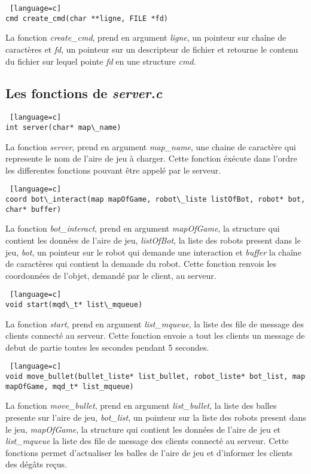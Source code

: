 \documentclass[a4paper, 11pt]{article}
\begin{document}
\begin {lstlisting} [language=c]
cmd create_cmd(char **ligne, FILE *fd)
\end{lstlisting}
La fonction \emph{create\_cmd}, prend en argument \emph{ligne}, un pointeur sur chaîne de caractères et \emph{fd}, un pointeur sur un descripteur de fichier et retourne le contenu du fichier sur lequel pointe \emph{fd} en une structure \emph{cmd}.\\

\newpage
\subsection{Les fonctions de \emph{server.c}}
\begin {lstlisting} [language=c]
int server(char* map\_name)
\end{lstlisting}
La fonction \emph{server}, prend en argument \emph{map\_name}, une chaine de caractère qui represente le nom de l'aire de jeu à charger. Cette
fonction éxécute dans l'ordre les differentes fonctions pouvant être appelé par le serveur.\\

\begin {lstlisting} [language=c]
coord bot\_interact(map mapOfGame, robot\_liste listOfBot, robot* bot, char* buffer)
\end{lstlisting}
La fonction \emph{bot\_interact}, prend en argument \emph{mapOfGame}, la structure qui contient les données de l'aire de jeu, \emph{listOfBot}, la liste des robots present dans le jeu, \emph{bot}, un pointeur sur le robot qui demande une interaction et \emph{buffer} la chaîne de caractères qui contient la demande du robot. Cette fonction renvois les coordonnées de l'objet, demandé par le client, au serveur.\\

\begin {lstlisting} [language=c]
void start(mqd\_t* list\_mqueue)
\end{lstlisting}
La fonction \emph{start}, prend en argument \emph{list\_mqueue}, la liste des file de message des clients connecté au serveur. Cette fonction envoie a tout les clients un message de debut de partie toutes les secondes pendant 5 secondes.\\

\begin {lstlisting} [language=c]
void move_bullet(bullet_liste* list_bullet, robot_liste* bot_list, map mapOfGame, mqd_t* list_mqueue)
\end{lstlisting}
La fonction \emph{move\_bullet}, prend en argument \emph{list\_bullet}, la liste des balles presente sur l'aire de jeu, \emph{bot\_list}, un pointeur sur la liste des robots present dans le jeu, \emph{mapOfGame}, la structure qui contient les données de l'aire de jeu et \emph{list\_mqueue} la liste des file de message des clients connecté au serveur. Cette fonctions permet d'actualiser les balles de l'aire de jeu et d'informer les clients des dégâts reçus.\\
\end{document}
